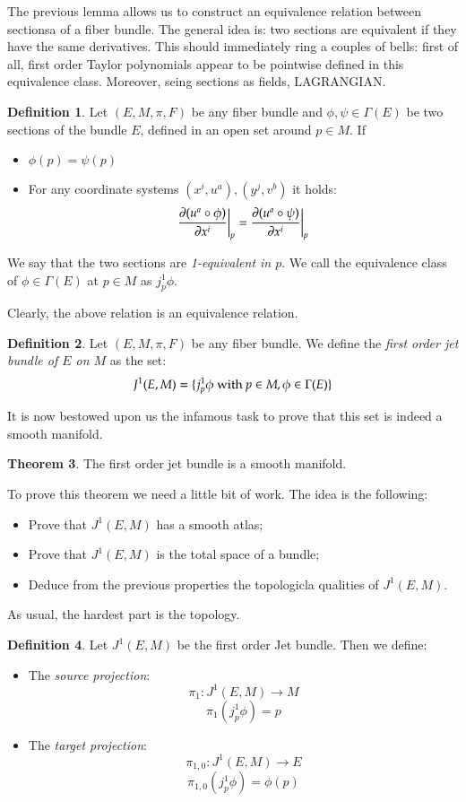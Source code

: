 \documentclass[12pt,a4paper]{report}
\theoremstyle{definition}
\newtheorem{Def}{Definition}[chapter]
\theoremstyle{Theorem}
\newtheorem{Theo}[Def]{Theorem}
\theoremstyle{break}
\theoremstyle{definition}
\begin{document}
	The previous lemma allows us to construct an equivalence relation between sectionsa of a fiber bundle. The general idea is: two sections are equivalent if they have the same derivatives. This should immediately ring a couples of bells: first of all, first order Taylor polynomials appear to be pointwise defined in this equivalence class. Moreover, seing sections as fields, LAGRANGIAN.
	\begin{Def}
		Let $(E,M,\pi,F)$ be any fiber bundle and $\phi,\psi\in\Gamma(E)$ be two sections of the bundle $E$, defined in an open set around $p\in M$. If
		\begin{itemize}
			\item $\phi(p)=\psi(p)$ 
			\item For any coordinate systems $(x^i,u^a),(y^j,v^b)$ it holds:
			$${\partial(u^a\circ\phi) \over \partial{x^i}}\bigg|_p={\partial(u^a\circ\psi) \over \partial{x^i}}\bigg|_p$$
		\end{itemize} 
		We say that the two sections are \textit{1-equivalent in $p$}. We call the equivalence class of $\phi\in\Gamma(E)$ at $p\in M$ as $j_p^1\phi$.
	\end{Def}
	Clearly, the above relation is an equivalence relation.
	\begin{Def}
		Let $(E,M,\pi,F)$ be any fiber bundle. We define the \textit{first order jet bundle of $E$ on $M$} as the set:
		$$J^1(E,M)=\{j^1_p\phi \hbox{ with }p\in M, \phi\in\Gamma(E)\}$$
	\end{Def}
	It is now bestowed upon us the infamous task to prove that this set is indeed a smooth manifold.
	\begin{Theo}
		The first order jet bundle is a smooth manifold.
	\end{Theo}
	To prove this theorem we need a little bit of work. The idea is the following:
	\begin{itemize}
		\item Prove that $J^1(E,M)$ has a smooth atlas;
		\item Prove that $J^1(E,M)$ is the total space of a bundle;
		\item Deduce from the previous properties the topologicla qualities of $J^1(E,M)$. 
	\end{itemize}
	As usual, the hardest part is the topology.
	\begin{Def}
		Let $J^1(E,M)$ be the first order Jet bundle. Then we define:
		\begin{itemize}
			\item The \textit{source projection}:
			$$
				\pi_{1}:J^1(E,M)\longrightarrow M $$
				$$
				\pi_1(j^1_p\phi)=p$$	
			\item The \textit{target projection}:
			$$
			\pi_{1,0}:J^1(E,M)\longrightarrow E $$
			$$
			\pi_{1,0}(j^1_p\phi)=\phi(p)$$		
		\end{itemize}
	\end{Def}
\end{document}
